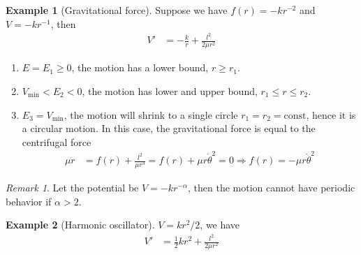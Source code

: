 \documentclass[twoside,9pt]{article}
\numberwithin{equation}{section} %
\newcommand{\lms}{\fontfamily{lmss}\selectfont} %
\theoremstyle{definition}
\newtheorem{example}{\lms Example}[section]
\theoremstyle{remark}
\newtheorem*{remark}{Remark}
\begin{document}
\begin{example}[Gravitational force]
Suppose we have $f(r) = -kr^{-2}$ and $V=-kr^{-1}$, then
\begin{align*}
    V' &= -\frac{k}{r} + \frac{l^2}{2\mu r^2}
\end{align*}
\tikzexternalenable
\begin{figure}[H]
    \centering
\end{figure}
\tikzexternaldisable
\begin{enumerate}[label=\arabic*)]
    \item $E=E_1\geq 0$, the motion has a lower bound, $r\geq r_1$.
    \item $V_\text{min} < E_2 < 0$, the motion has lower and upper bound,
    $r_1\leq r \leq r_2$.
    \item $E_3 = V_\text{min}$, the motion will shrink to a single circle
    $r_1 = r_2 = \text{const}$, hence it is a circular motion.
    In this case, the gravitational force is equal to the centrifugal
    force
    \begin{align*}
        \mu\ddot{r} &= f(r) + \frac{l^2}{\mu r^3}
        = f(r) + \mu r\dot{\theta}^2 = 0
        \Rightarrow
        f(r) = -\mu r\dot{\theta}^2
    \end{align*}
\end{enumerate}
\begin{remark}
Let the potential be $V=-kr^{-\alpha}$,
then the motion cannot have periodic behavior if $\alpha>2$.
\end{remark}
\end{example}

\begin{example}[Harmonic oscillator]
$V=kr^2/2$, we have
\begin{align*}
    V' &= \frac{1}{2}kr^2 + \frac{l^2}{2\mu r^2}
\end{align*}
\end{example}
\end{document}
